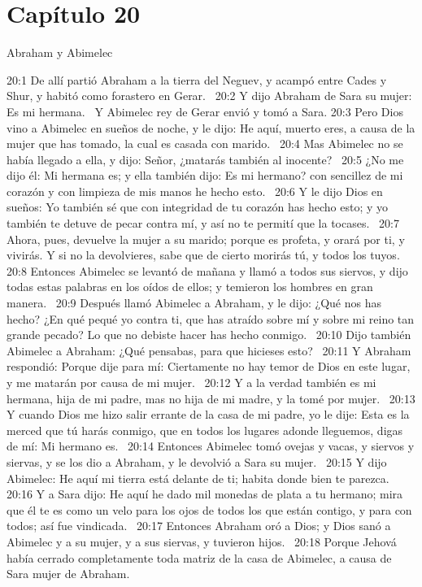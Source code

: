 \section*{Capítulo 20}
Abraham y Abimelec  

20:1 De allí partió Abraham a la tierra del Neguev, y acampó entre Cades y Shur, y habitó como forastero en Gerar.  
20:2 Y dijo Abraham de Sara su mujer: Es mi hermana.  Y Abimelec rey de Gerar envió y tomó a Sara. 
20:3 Pero Dios vino a Abimelec en sueños de noche, y le dijo: He aquí, muerto eres, a causa de la mujer que has tomado, la cual es casada con marido.  
20:4 Mas Abimelec no se había llegado a ella, y dijo: Señor, ¿matarás también al inocente?  
20:5 ¿No me dijo él: Mi hermana es; y ella también dijo: Es mi hermano? con sencillez de mi corazón y con limpieza de mis manos he hecho esto.  
20:6 Y le dijo Dios en sueños: Yo también sé que con integridad de tu corazón has hecho esto; y yo también te detuve de pecar contra mí, y así no te permití que la tocases.  
20:7 Ahora, pues, devuelve la mujer a su marido; porque es profeta, y orará por ti, y vivirás. Y si no la devolvieres, sabe que de cierto morirás tú, y todos los tuyos.  
20:8 Entonces Abimelec se levantó de mañana y llamó a todos sus siervos, y dijo todas estas palabras en los oídos de ellos; y temieron los hombres en gran manera.  
20:9 Después llamó Abimelec a Abraham, y le dijo: ¿Qué nos has hecho? ¿En qué pequé yo contra ti, que has atraído sobre mí y sobre mi reino tan grande pecado? Lo que no debiste hacer has hecho conmigo.  
20:10 Dijo también Abimelec a Abraham: ¿Qué pensabas, para que hicieses esto?  
20:11 Y Abraham respondió: Porque dije para mí: Ciertamente no hay temor de Dios en este lugar, y me matarán por causa de mi mujer.  
20:12 Y a la verdad también es mi hermana, hija de mi padre, mas no hija de mi madre, y la tomé por mujer.  
20:13 Y cuando Dios me hizo salir errante de la casa de mi padre, yo le dije: Esta es la merced que tú harás conmigo, que en todos los lugares adonde lleguemos, digas de mí: Mi hermano es.  
20:14 Entonces Abimelec tomó ovejas y vacas, y siervos y siervas, y se los dio a Abraham, y le devolvió a Sara su mujer.  
20:15 Y dijo Abimelec: He aquí mi tierra está delante de ti; habita donde bien te parezca.  
20:16 Y a Sara dijo: He aquí he dado mil monedas de plata a tu hermano; mira que él te es como un velo para los ojos de todos los que están contigo, y para con todos; así fue vindicada.  
20:17 Entonces Abraham oró a Dios; y Dios sanó a Abimelec y a su mujer, y a sus siervas, y tuvieron hijos.  
20:18 Porque Jehová había cerrado completamente toda matriz de la casa de Abimelec, a causa de Sara mujer de Abraham.  
